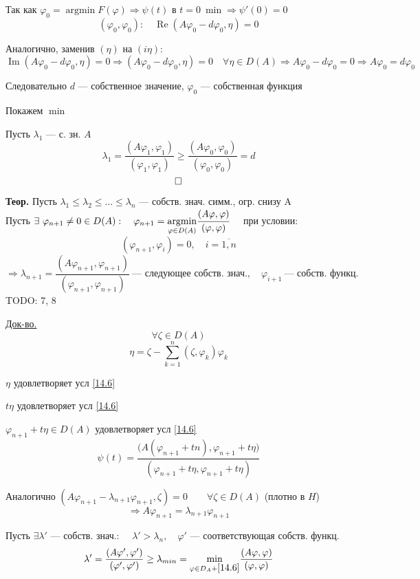\documentclass[12pt, a4paper]{article}
\newcommand{\Sum}{\sum\limits}
\begin{document}
Так как $ \varphi_0 = \operatorname{argmin} F(\varphi) \Rightarrow \psi(t) $ в $ t=0 \ \min \Rightarrow \psi'(0) = 0 $
\[ (\varphi_0, \varphi_0): \quad \operatorname{Re} (A \varphi_0 - d \varphi_0, \eta) = 0 \]

Аналогично, заменив $ (\eta) $ на $ (i\eta):$
\[ \operatorname{Im} (A \varphi_0 - d \varphi_0, \eta) = 0 \Rightarrow (A \varphi_0 - d \varphi_0, \eta) = 0 \quad \forall \eta \in D(A) \Rightarrow A \varphi_0 - d \varphi_0 = 0 \Rightarrow A \varphi_0 = d \varphi_0 \]

Следовательно $d$ --- собственное значение, $\varphi_0$ --- собственная функция

Покажем \underline{$\min$}

Пусть $ \lambda_1 $ --- с. зн. $A$
\[ \lambda_1 = \frac{(A \varphi_1, \varphi_1)}{(\varphi_1, \varphi_1)} \geq \frac{(A \varphi_0, \varphi_0)}{(\varphi_0, \varphi_0)} = d \label{14.5} \tag{14.5} \]
\[ \hfill \square \]

\textbf{Теор.} Пусть $ \lambda_1 \leq \lambda_2 \leq ... \leq \lambda_n $ --- собств. знач. симм., огр. снизу A \\
Пусть $ \exists \ \varphi_{n+1} \neq 0 \in D(A): \quad \varphi_{n+1}= \underset{\varphi \in D(A)}{\operatorname{argmin}} \cfrac{(A \varphi, \varphi)}{(\varphi, \varphi)} \quad $ при условии:
\[ (\varphi_{n+1}, \varphi_i) = 0, \quad i=\overline{1,n} \label{14.6} \tag{14.6} \]
\[ \Rightarrow \lambda_{n+1} = \frac{(A \varphi_{n+1}, \varphi_{n+1})}{(\varphi_{n+1}, \varphi_{n+1})} \ \text{--- следующее собств. знач.}, \quad \varphi_{i+1} \ \text{--- собств. функц.} \]
TODO: 7, 8

\underline{Док-во.}
\[ \forall \zeta \in D(A) \]
\[ \eta = \zeta - \Sum_{k=1}^{n} (\zeta, \varphi_k) \varphi_k \]

$ \eta $ удовлетворяет усл \eqref{14.6}

$ t \eta $ удовлетворяет усл \eqref{14.6}

$ \varphi_{n+1} + t \eta \in D(A) $ удовлетворяет усл \eqref{14.6}
\[ \psi(t) = \frac{\bigl(A(\varphi_{n+1}+tn), \varphi_{n+1}+t\eta \bigr)}{(\varphi_{n+1}+t\eta, \varphi_{n+1} + t\eta)} \]

Аналогично \quad $ (A \varphi_{n+1} - \lambda_{n+1} \varphi_{n+1}, \zeta) = 0 \qquad \forall \zeta \in D(A) $ (плотно в $H$)
\[ \Rightarrow A \varphi_{n+1} = \lambda_{n+1} \varphi_{n+1} \]

Пусть $ \exists \lambda' $ --- собств. знач.: \ \ $ \lambda' > \lambda_n, \quad \varphi' $ --- соответствующая собств. функц.
\[ \lambda' = \frac{(A\varphi', \varphi')}{(\varphi', \varphi')} \geq \lambda_{min} = \underset{\varphi \in D_A +  \eqref{14.6}}{\min} \frac{( A \varphi, \varphi )}{(\varphi, \varphi)} \]
\end{document}
